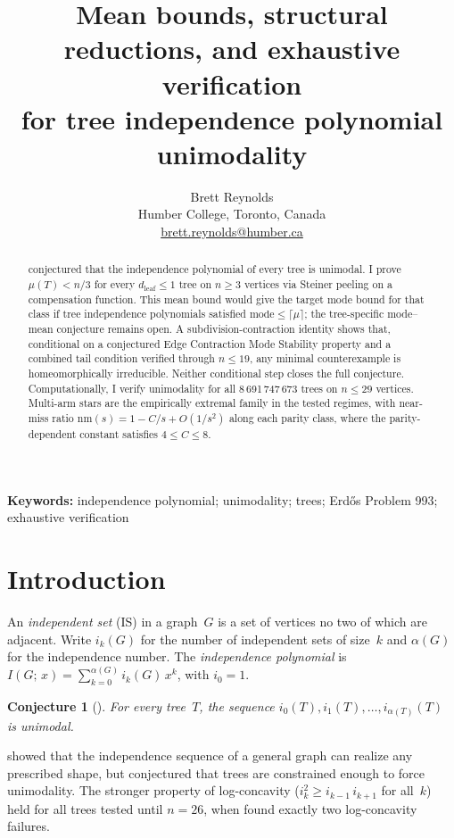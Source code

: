 \documentclass[12pt,oneside]{article}
\title{Mean bounds, structural reductions, and exhaustive verification\\
  for tree independence polynomial unimodality}
\author{Brett Reynolds\\
  \small Humber College, Toronto, Canada\\
  \small \href{mailto:brett.reynolds@humber.ca}{brett.reynolds@humber.ca}}
\date{}
\newtheorem{conjecture}[theorem]{Conjecture}
\theoremstyle{remark}
\newcommand{\nm}{\mathrm{nm}}             %
\newcommand{\dleaf}{d_{\mathrm{leaf}}}    %
\begin{document}
\maketitle

\begin{abstract}
\textcite{alavi1987} conjectured that the independence polynomial of every tree is unimodal.
I prove $\mu(T) < n/3$ for every $\dleaf \le 1$ tree on $n \ge 3$ vertices via Steiner peeling on a compensation function.
This mean bound would give the target mode bound for that class if tree independence polynomials satisfied $\mathrm{mode} \le \lceil\mu\rceil$; the tree-specific mode--mean conjecture remains open.
A subdivision-contraction identity shows that, conditional on a conjectured Edge Contraction Mode Stability property and a combined tail condition verified through $n \le 19$, any minimal counterexample is homeomorphically irreducible.
Neither conditional step closes the full conjecture.
Computationally, I verify unimodality for all 8\,691\,747\,673 trees on $n \le 29$ vertices.
Multi-arm stars are the empirically extremal family in the tested regimes, with near-miss ratio $\nm(s) = 1 - C/s + O(1/s^2)$ along each parity class, where the parity-dependent constant satisfies $4\le C\le 8$.
\end{abstract}

\noindent\textbf{Keywords:} independence polynomial; unimodality; trees; Erd\H{o}s Problem 993; exhaustive verification

\section{Introduction}\label{sec:intro}

An \emph{independent set} (IS) in a graph~$G$ is a set of vertices no two of which are adjacent.
Write $i_k(G)$ for the number of independent sets of size~$k$ and $\alpha(G)$ for the independence number.
The \emph{independence polynomial} is $I(G;\, x) = \sum_{k=0}^{\alpha(G)} i_k(G)\, x^k$, with $i_0 = 1$.

\begin{conjecture}[\citealp{alavi1987}]\label{conj:main}
  For every tree~$T$, the sequence $i_0(T), i_1(T), \dotsc, i_{\alpha(T)}(T)$ is unimodal.
\end{conjecture}

\textcite{alavi1987} showed that the independence sequence of a general graph can realize any prescribed shape, but conjectured that trees are constrained enough to force unimodality.
The stronger property of log-concavity ($i_k^2 \ge i_{k-1}\, i_{k+1}$ for all~$k$) held for all trees tested until $n = 26$, when \textcite{kadrawi2025} found exactly two log-concavity failures.
\end{document}
